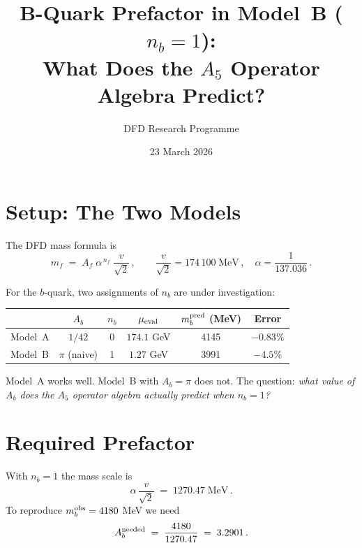 \documentclass[11pt]{article}
\title{B-Quark Prefactor in Model~B ($n_b = 1$):\\
What Does the $A_5$ Operator Algebra Predict?}
\author{DFD Research Programme}
\date{23 March 2026}
\begin{document}
\maketitle

\section{Setup: The Two Models}

The DFD mass formula is
\begin{equation}
  m_f \;=\; A_f \;\alpha^{\,n_f}\;\frac{v}{\sqrt{2}}\,,
  \qquad
  \frac{v}{\sqrt{2}} = 174\,100\;\text{MeV}\,,\quad
  \alpha = \frac{1}{137.036}\,.
\end{equation}

For the $b$-quark, two assignments of $n_b$ are under investigation:

\medskip
\begin{center}
\begin{tabular}{lccccc}
\toprule
 & $A_b$ & $n_b$ & $\mu_{\rm eval}$ & $m_b^{\rm pred}$ (MeV) & Error \\
\midrule
Model~A & $1/42$ & 0 & $174.1$ GeV & 4145 & $-0.83\%$ \\
Model~B & $\pi$ (naive) & 1 & $1.27$ GeV & 3991 & $-4.5\%$ \\
\bottomrule
\end{tabular}
\end{center}

\medskip\noindent
Model~A works well.  Model~B with $A_b = \pi$ does not.
The question: \emph{what value of $A_b$ does the $A_5$ operator algebra
actually predict when $n_b = 1$?}

\section{Required Prefactor}

With $n_b = 1$ the mass scale is
\begin{equation}
  \alpha\,\frac{v}{\sqrt{2}} \;=\; 1270.47\;\text{MeV}\,.
\end{equation}
To reproduce $m_b^{\rm obs} = 4180$ MeV we need
\begin{equation}\label{eq:Ab-needed}
  A_b^{\rm needed} \;=\; \frac{4180}{1270.47} \;=\; 3.2901\,.
\end{equation}
\end{document}
